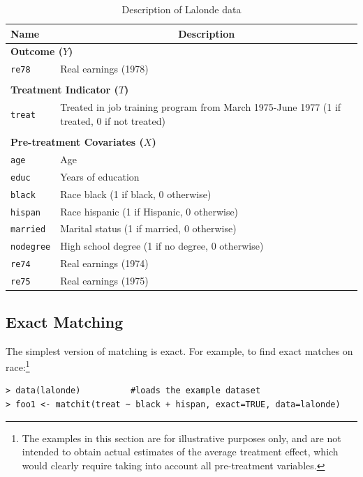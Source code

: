\documentclass[oneside,letterpaper,titlepage]{article}
\begin{document}
\begin{table}[h]
\label{dwvars}
\centering
\begin{tabular}{lp{3in}}
  \hline 
  \multicolumn{1}{l}{Name} & \multicolumn{1}{c}{Description} \\
  \hline
  \multicolumn{2}{l}{\textbf{Outcome ($Y$)}} \\ 
  \texttt{re78} & Real earnings (1978) \\\\
  \multicolumn{2}{l}{\textbf{Treatment Indicator ($T$)}} \\
  \texttt{treat} & Treated in job training program from March 1975-June
  1977 (1 if treated, 0 if not treated)
  \\ \\
  \multicolumn{2}{l}{\textbf{Pre-treatment Covariates ($X$)}} \\
  \texttt{age} & Age\\
  \texttt{educ} & Years of education \\
  \texttt{black} & Race black (1 if black, 0 otherwise) \\
  \texttt{hispan} & Race hispanic  (1 if Hispanic, 0 otherwise) \\
  \texttt{married} & Marital status (1 if married, 0 otherwise) \\
  \texttt{nodegree} & High school degree (1 if no degree, 0 otherwise)\\
  \texttt{re74} & Real earnings (1974) \\
  \texttt{re75} & Real earnings (1975) \\ 
  \hline
\end{tabular}\label{lalonde}
\caption{Description of Lalonde data}
\end{table}

\subsection{Exact Matching \label{exactm}}
The simplest version of matching is exact.  For example, to find exact
matches on race:\footnote{The examples in this section are for
  illustrative purposes only, and are not intended to obtain actual
  estimates of the average treatment effect, which would clearly
  require taking into account all pre-treatment variables.}

\begin{verbatim}
> data(lalonde)          #loads the example dataset
> foo1 <- matchit(treat ~ black + hispan, exact=TRUE, data=lalonde)
\end{verbatim}
\end{document}
